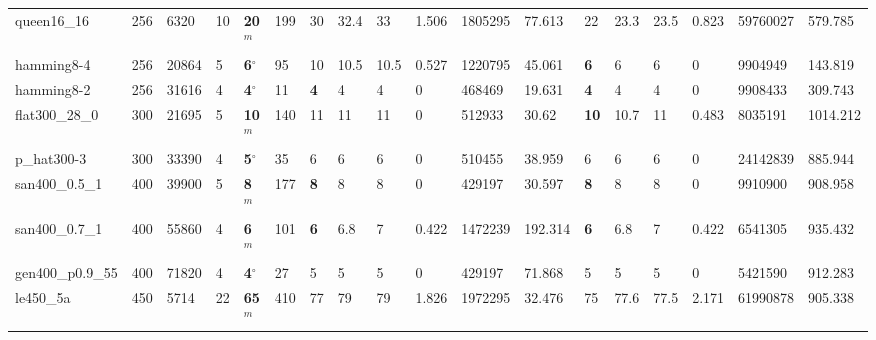 \begin{table}[h!]
{\begin{tabular}{llllllllllllllllll}
            queen16\_16 & 256 & 6320 & 10 & \textbf{20}$^{m}$ & 199 & 30 & 32.4 & 33 & 1.506 & 1805295 & 77.613 & 22 & 23.3 & 23.5 & 0.823 & 59760027 & 579.785 \\
            hamming8-4 & 256 & 20864 & 5 & \textbf{6}$^{\circ}$ & 95 & 10 & 10.5 & 10.5 & 0.527 & 1220795 & 45.061 & \textbf{6} & 6 & 6 & 0 & 9904949 & 143.819 \\
            hamming8-2 & 256 & 31616 & 4 & \textbf{4}$^{\circ}$ & 11 & \textbf{4} & 4 & 4 & 0 & 468469 & 19.631 & \textbf{4} & 4 & 4 & 0 & 9908433 & 309.743 \\
            flat300\_28\_0 & 300 & 21695 & 5 & \textbf{10}$^{m}$ & 140 & 11 & 11 & 11 & 0 & 512933 & 30.62 & \textbf{10} & 10.7 & 11 & 0.483 & 8035191 & 1014.212 \\
            p\_hat300-3 & 300 & 33390 & 4 & \textbf{5}$^{\circ}$ & 35 & 6 & 6 & 6 & 0 & 510455 & 38.959 & 6 & 6 & 6 & 0 & 24142839 & 885.944 \\
            san400\_0.5\_1 & 400 & 39900 & 5 & \textbf{8}$^{m}$ & 177 & \textbf{8} & 8 & 8 & 0 & 429197 & 30.597 & \textbf{8} & 8 & 8 & 0 & 9910900 & 908.958 \\
            san400\_0.7\_1 & 400 & 55860 & 4 & \textbf{6}$^{m}$ & 101 & \textbf{6} & 6.8 & 7 & 0.422 & 1472239 & 192.314 & \textbf{6} & 6.8 & 7 & 0.422 & 6541305 & 935.432 \\
            gen400\_p0.9\_55 & 400 & 71820 & 4 & \textbf{4}$^{\circ}$ & 27 & 5 & 5 & 5 & 0 & 429197 & 71.868 & 5 & 5 & 5 & 0 & 5421590 & 912.283 \\
            le450\_5a & 450 & 5714 & 22 & \textbf{65}$^{m}$ & 410 & 77 & 79 & 79 & 1.826 & 1972295 & 32.476 & 75 & 77.6 & 77.5 & 2.171 & 61990878 & 905.338 \\
            \bottomrule
        \end{tabular}
    }{
}
\end{table}

